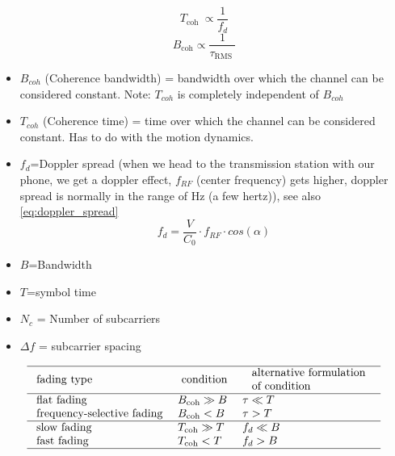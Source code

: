 \begin{equation}\label{eq:ofdm_coherence}
T_{\text {coh }} \propto \frac{1}{f_d}
\end{equation}
\begin{equation}
B_{\mathrm{coh}} \propto \frac{1}{\tau_{\text {RMS }}}
\end{equation}
\begin{itemize}
    \item $B_{coh}$ (Coherence bandwidth) = bandwidth over which the channel can be considered constant. Note: $T_{coh}$ is completely independent of $B_{coh}$
    \item $T_{coh}$ (Coherence time) = time over which the channel can be considered constant. Has to do with the motion dynamics.
    \item $f_d$=Doppler spread (when we head to the transmission station with our phone, we get a doppler effect, $f_{RF}$ (center frequency) gets higher, doppler spread is normally in the range of Hz (a few hertz)), see also \autoref{eq:doppler_spread}
    \begin{equation}\label{eq:doppler_spread}
        f_d=\frac{V}{C_0}\cdot f_{RF}\cdot cos(\alpha)
    \end{equation}
    \item $B$=Bandwidth
    \item $T$=symbol time
    \item $N_c$ = Number of subcarriers
    \item $\Delta f$ = subcarrier spacing
\end{itemize}



$$
\begin{array}{lll}
\hline \text { fading type } & \text { condition } & \begin{array}{l}
\text { alternative formulation } \\
\text { of condition }
\end{array} \\
\hline \text { flat fading } & B_{\mathrm{coh}} \gg B & \tau \ll T \\
\text { frequency-selective fading } & B_{\mathrm{coh}}<B & \tau>T \\
\hline \text { slow fading } & T_{\mathrm{coh}} \gg T & f_d \ll B \\
\text { fast fading } & T_{\mathrm{coh}}<T & f_d>B \\
\hline
\end{array}
$$



